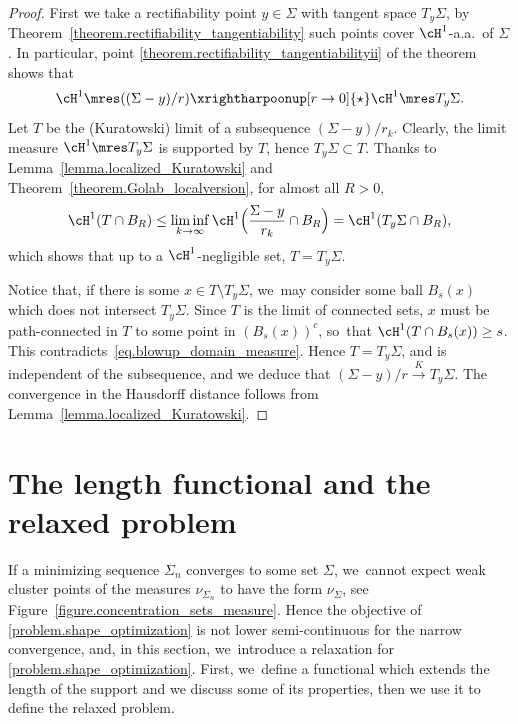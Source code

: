 \begin{proof}
First we take a rectifiability point $y \in \Sigma$ with tangent space $T_y\Sigma$,
by Theorem~\ref{theorem.rectifiability_tangentiability} such points cover $\cH^1$-a.a.~of $\Sigma$.
In particular, point \eqref{theorem.rectifiability_tangentiabilityii} of the theorem shows that
\[
\cH^1\mres((\Sigma-y)/r)\xrightharpoonup[r \to 0]{\star} \cH^1\mres T_y\Sigma.
\]
Let $T$ be the (Kuratowski) limit of a subsequence $(\Sigma-y)/r_k$.
Clearly, the limit measure $\cH^1\mres T_y\Sigma$ is supported by $T$, hence $T_y\Sigma\subset T$.
Thanks
to Lemma~\ref{lemma.localized_Kuratowski} and Theorem~\ref{theorem.Golab_localversion}, for
almost all $R>0$,
\begin{equation}
\cH^1(T\cap B_R) \le \liminf_{k\to\infty} \cH^1\Bigl(\frac{\Sigma-y}{r_k}\cap B_R\Bigr)
= \cH^1(T_y\Sigma\cap B_R),\label{eq.blowup_domain_measure}
\end{equation}
which shows that up to a $\cH^1$-negligible set, $T=T_y\Sigma$.

Notice that, if there is some $x \in T\setminus T_y\Sigma$, we~may consider some ball $B_s(x)$ which does not intersect $T_y\Sigma$. Since $T$ is the limit of connected sets, $x$ must be path-connected in $T$ to some point in $(B_s(x))^c$, so~that $\cH^1(T\cap B_s(x))\ge s$. This contradicts~\eqref{eq.blowup_domain_measure}. Hence $T=T_y\Sigma$, and is independent of the subsequence, and we deduce that $(\Sigma-y)/r\stackrel{K}{\to} T_y\Sigma$. The convergence in the Hausdorff distance follows from Lemma~\ref{lemma.localized_Kuratowski}.
\end{proof}

\section{The length functional and the relaxed problem}\label{section.the_problem}
If a minimizing sequence $\Sigma_n$ converges to some set $\Sigma$, we~cannot expect weak cluster points of the measures $\nu_{\Sigma_n}$ to have the form $\nu_\Sigma$, see Figure~\ref{figure.concentration_sets_measure}. Hence the objective of \eqref{problem.shape_optimization} is not lower semi-continuous for the narrow convergence, and, in this section, we~introduce a relaxation for \eqref{problem.shape_optimization}. First, we~define a functional which extends the length of the support and we discuss some of its properties, then we use it to define the relaxed problem.

